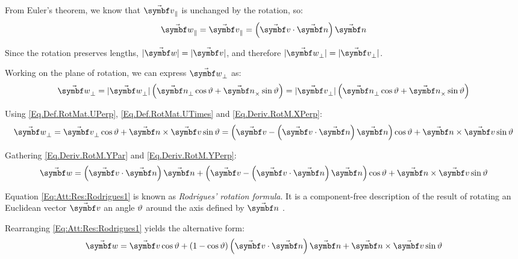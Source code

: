 From Euler's theorem, we know that $\vasub{v}{\parallel}$ is unchanged by the rotation, so:
\begin{equation}\label{Eq.Deriv.RotM.YPar}
\vasub{w}{\parallel} = \vasub{v}{\parallel} = \rndp{\vabs{v} \cdot \vabs{\rotax}}\vabs{\rotax}
\end{equation}

Since the rotation preserves lengths, $|\vabs{w}| = |\vabs{v}|$, and therefore $|\vasub{w}{\perp}| = |\vasub{v}{\perp}|$.

Working on the plane of rotation, we can express $\vasub{w}{\perp}$ as:
\begin{equation*}
	\vasub{w}{\perp} = |\vasub{w}{\perp}| \rndp{\vasub{\rotax}{\perp} \cos \rotang + \vasub{\rotax}{\times} \sin \rotang } = |\vasub{v}{\perp}| \rndp{\vasub{\rotax}{\perp} \cos \rotang + \vasub{\rotax}{\times} \sin \rotang}
\end{equation*}

Using \eqref{Eq.Def.RotMat.UPerp}, \eqref{Eq.Def.RotMat.UTimes} and \eqref{Eq.Deriv.RotM.XPerp}:
\begin{equation}\label{Eq.Deriv.RotM.YPerp}
\vasub{w}{\perp} 	=  \vasub{v}{\perp} \cos \rotang + \vabs{\rotax} \times \vabs{v} \sin \rotang
			= \rndp{\vabs{v} - \rndp{\vabs{v}\cdot \vabs{\rotax}} \vabs{\rotax}} \cos \rotang + \vabs{\rotax} \times \vabs{v} \sin \rotang 
\end{equation}

Gathering \eqref{Eq.Deriv.RotM.YPar} and \eqref{Eq.Deriv.RotM.YPerp}:
\begin{equation}\label{Eq:Att:Res:Rodrigues1}
\vabs{w} =  \rndp{\vabs{v}\cdot \vabs{\rotax}}\vabs{\rotax} + \rndp{\vabs{v} -  \rndp{\vabs{v}\cdot \vabs{\rotax}}\vabs{\rotax}} \cos \rotang + \vabs{\rotax} \times \vabs{v} \sin \rotang
\end{equation}

Equation \eqref{Eq:Att:Res:Rodrigues1} is known as \emph{Rodrigues' rotation formula}. It is a component-free description of the result of rotating an Euclidean vector $\vabs{v}$ an angle $\vartheta$ around the axis defined by $\vabs{\rotax}$ .

Rearranging \eqref{Eq:Att:Res:Rodrigues1} yields the alternative form:
\begin{equation}\label{Eq:Att:Res:Rodrigues2}
\vabs{w} =  \vabs{v} \cos \rotang + (1-\cos \rotang) \rndp{\vabs{v}\cdot \vabs{\rotax}}\vabs{\rotax}  + \vabs{\rotax} \times \vabs{v} \sin \rotang 
\end{equation}


